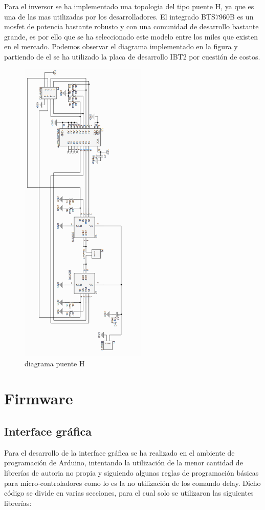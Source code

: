 Para el inversor se ha implementado una topologia del tipo puente H, ya que es una de las mas utilizadas por los desarrolladores. El integrado BTS7960B es un mosfet de potencia bastante robusto y con una comunidad de desarrollo bastante grande, es por ello que se ha seleccionado este modelo entre los miles que existen en el mercado. Podemos observar el diagrama implementado en la figura y partiendo de el se ha utilizado la placa de desarrollo IBT2 por cuestión de costos. \\

\begin{figure}[H]
\centering
\includegraphics[width=6cm]{Capitulo3/figs/ibt2.png}
\caption{diagrama puente H}
\end{figure}

\section{Firmware}
\subsection{Interface gráfica}
Para el desarrollo de la interface gráfica se ha realizado en el ambiente de programación de Arduino, intentando la utilización de la menor cantidad de librerías de autoria no propia y siguiendo algunas reglas de programación básicas para micro-controladores como lo es la no utilización de los comando delay. Dicho código se divide en varias secciones, para el cual solo se utilizaron las siguientes librerías:

